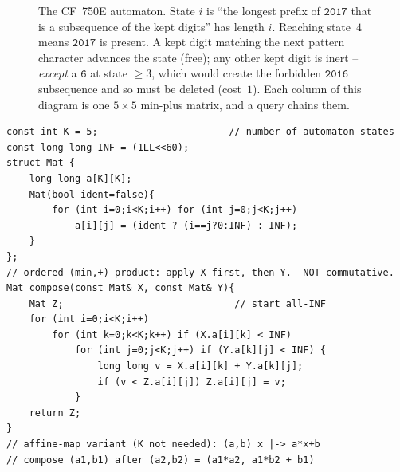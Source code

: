\begin{figure}[H]
\centering
{}
\caption{The CF~750E automaton.  State \(i\) is ``the longest prefix of
\(\texttt{2017}\) that is a subsequence of the kept digits'' has length \(i\).
Reaching state~\(4\) means \(\texttt{2017}\) is present.  A kept digit matching
the next pattern character advances the state (free); any other kept digit is
inert -- \emph{except} a \(\texttt{6}\) at state \(\ge3\), which would create the
forbidden \(\texttt{2016}\) subsequence and so must be deleted (cost~\(1\)).  Each
column of this diagram is one \(5\times5\) min-plus matrix, and a query chains
them.}
\label{fig:c29-func-auto}
\end{figure}

\begin{lstlisting}[caption={Generic min-plus matrix and its composition (the merge operator of a function-composition tree). The identity is the (min,+) identity: 0 on the diagonal, infinity elsewhere. ASCII only}, label={lst:c29-func}]
const int K = 5;                       // number of automaton states
const long long INF = (1LL<<60);
struct Mat {
    long long a[K][K];
    Mat(bool ident=false){
        for (int i=0;i<K;i++) for (int j=0;j<K;j++)
            a[i][j] = (ident ? (i==j?0:INF) : INF);
    }
};
// ordered (min,+) product: apply X first, then Y.  NOT commutative.
Mat compose(const Mat& X, const Mat& Y){
    Mat Z;                              // start all-INF
    for (int i=0;i<K;i++)
        for (int k=0;k<K;k++) if (X.a[i][k] < INF)
            for (int j=0;j<K;j++) if (Y.a[k][j] < INF) {
                long long v = X.a[i][k] + Y.a[k][j];
                if (v < Z.a[i][j]) Z.a[i][j] = v;
            }
    return Z;
}
// affine-map variant (K not needed): (a,b) x |-> a*x+b
// compose (a1,b1) after (a2,b2) = (a1*a2, a1*b2 + b1)
\end{lstlisting}

